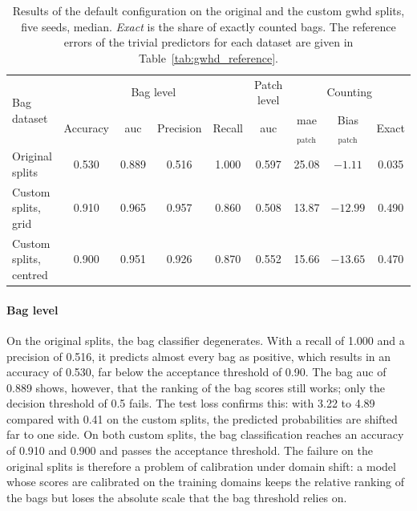 \documentclass[12pt,parskip = half, DIV=classic,listof=totoc]{scrartcl}
\begin{document}
				\begin{table}[htbp]
					\centering
					\footnotesize
					\setlength{\tabcolsep}{4pt}
					\begin{tabular}{@{}lcccccccc@{}}
						\toprule
						\multirow{2}{*}{Bag dataset} & \multicolumn{4}{c}{Bag level} & Patch level & \multicolumn{3}{c}{Counting} \\
						\cmidrule(lr){2-5}\cmidrule(lr){6-6}\cmidrule(lr){7-9}
						& Accuracy & \acs*{auc} & Precision & Recall & \acs*{auc} & \acs*{mae}$_{\text{patch}}$ & Bias$_{\text{patch}}$ & Exact \\
						\midrule
						Original splits        & 0.530 & 0.889 & 0.516 & 1.000 & 0.597 & 25.08 & $-1.11$  & 0.035 \\
						Custom splits, grid    & 0.910 & 0.965 & 0.957 & 0.860 & 0.508 & 13.87 & $-12.99$ & 0.490 \\
						Custom splits, centred & 0.900 & 0.951 & 0.926 & 0.870 & 0.552 & 15.66 & $-13.65$ & 0.470 \\
						\bottomrule
					\end{tabular}
					\caption[Results of the default configuration on the three split variants]{Results of
					the default configuration on the original and the custom \ac{gwhd} splits, five seeds,
					median. \emph{Exact} is the share of exactly counted bags. The reference errors of the
					trivial predictors for each dataset are given in Table~\ref{tab:gwhd_reference}.}
					\label{tab:gwhd_splits}
				\end{table}
				
				\paragraph{Bag level}
				On the original splits, the bag classifier degenerates. With a recall of 1.000
				and a precision of 0.516, it predicts almost every bag as positive, which results
				in an accuracy of 0.530, far below the acceptance threshold of 0.90. The bag
				\ac{auc} of 0.889 shows, however, that the ranking of the bag scores still works;
				only the decision threshold of 0.5 fails. The test loss confirms this: with 3.22
				to 4.89 compared with 0.41 on the custom splits,
				the predicted probabilities are shifted far to one side. On both custom splits,
				the bag classification reaches an accuracy of 0.910 and 0.900 and passes the
				acceptance threshold. The failure on the original splits is therefore a problem
				of calibration under domain shift: a model whose scores are calibrated on the
				training domains keeps the relative ranking of the bags but loses the absolute
				scale that the bag threshold relies on.
				
\end{document}
